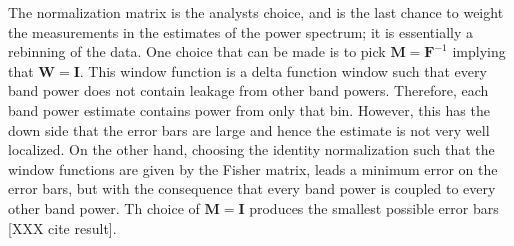 \documentclass[twocolumn,numberedappendix]{emulateapj} \shorttitle{PSA64}
\begin{document}
%
The normalization matrix is the analysts choice, and is the last chance to
weight the measurements in the estimates of the power spectrum; it is
essentially a rebinning of the data. One choice that can be made is to pick
$\mathbf{M} = \mathbf{F}^{-1}$ implying that $\mathbf{W} = \mathbf{I}$. This
window function is a delta function window such that every band power does not
contain leakage from other band powers. Therefore, each band power estimate
contains power from only that bin. However, this has the down side that the
error bars are large and hence the estimate is not very well localized. On the
other hand, choosing the identity normalization such that the window functions
are given by the Fisher matrix, leads a minimum error on the error bars, but
with the consequence that every band power is coupled to every other band
power. Th choice of $\mathbf{M} = \mathbf{I}$ produces the smallest possible error bars
[XXX cite result].  
\end{document}
